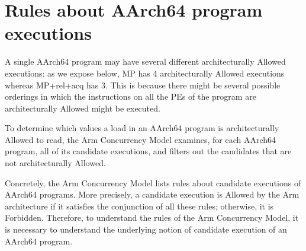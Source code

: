 \documentclass{book}
\begin{document}
\section{Rules about AArch64 program executions}

A single AArch64 program may have several different architecturally Allowed executions: as we expose below, MP has 4 architecturally Allowed executions whereas MP+rel+acq has 3. This is because there might be several possible orderings in which the instructions on all the PEs of the program are architecturally Allowed might be executed. 
 
To determine which values a load in an AArch64 program is architecturally Allowed to read, the Arm Concurrency Model examines, for each AArch64 program, all of its candidate executions, and filters out the candidates that are not architecturally Allowed.
 
Concretely, the Arm Concurrency Model lists rules about candidate executions of AArch64 programs. More precisely, a candidate execution is Allowed by the Arm architecture if it satisfies the conjunction of all these rules; otherwise, it is Forbidden.  
%
Therefore, to understand the rules of the Arm Concurrency Model, it is necessary to understand the underlying notion of candidate execution of an AArch64 program. 
 
\end{document}
